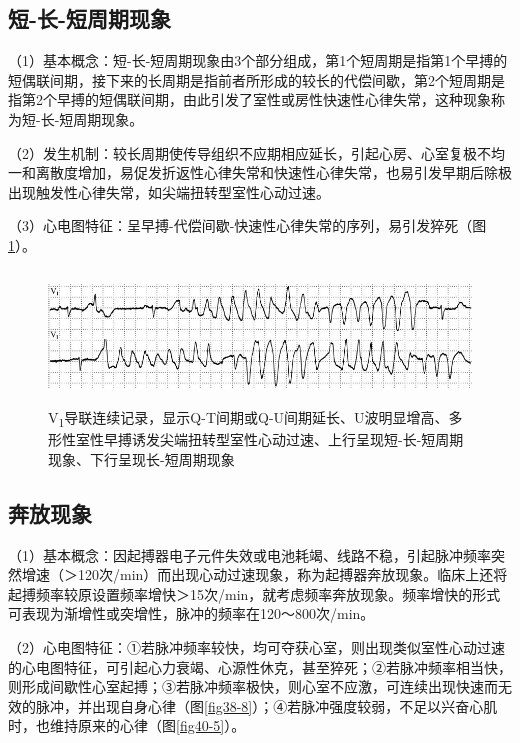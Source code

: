 \protect\hypertarget{text00047.htmlux5cux23subid536}{}{}

\subsection{短-长-短周期现象}

（1）基本概念：短-长-短周期现象由3个部分组成，第1个短周期是指第1个早搏的短偶联间期，接下来的长周期是指前者所形成的较长的代偿间歇，第2个短周期是指第2个早搏的短偶联间期，由此引发了室性或房性快速性心律失常，这种现象称为短-长-短周期现象。

（2）发生机制：较长周期使传导组织不应期相应延长，引起心房、心室复极不均一和离散度增加，易促发折返性心律失常和快速性心律失常，也易引发早期后除极出现触发性心律失常，如尖端扭转型室性心动过速。

（3）心电图特征：呈早搏-代偿间歇-快速性心律失常的序列，易引发猝死（图\ref{fig40-4}）。

\begin{figure}[!htbp]
 \centering
 \includegraphics[width=5.625in,height=1.39583in]{./images/Image00665.jpg}
 \captionsetup{justification=centering}
 \caption{V\textsubscript{1}导联连续记录，显示Q-T间期或Q-U间期延长、U波明显增高、多形性室性早搏诱发尖端扭转型室性心动过速、上行呈现短-长-短周期现象、下行呈现长-短周期现象}
 \label{fig40-4}
  \end{figure} 


\protect\hypertarget{text00047.htmlux5cux23subid537}{}{}

\subsection{奔放现象}

（1）基本概念：因起搏器电子元件失效或电池耗竭、线路不稳，引起脉冲频率突然增速（＞120次/min）而出现心动过速现象，称为起搏器奔放现象。临床上还将起搏频率较原设置频率增快＞15次/min，就考虑频率奔放现象。频率增快的形式可表现为渐增性或突增性，脉冲的频率在120～800次/min。

（2）心电图特征：①若脉冲频率较快，均可夺获心室，则出现类似室性心动过速的心电图特征，可引起心力衰竭、心源性休克，甚至猝死；②若脉冲频率相当快，则形成间歇性心室起搏；③若脉冲频率极快，则心室不应激，可连续出现快速而无效的脉冲，并出现自身心律（图\ref{fig38-8}）；④若脉冲强度较弱，不足以兴奋心肌时，也维持原来的心律（图\ref{fig40-5}）。

